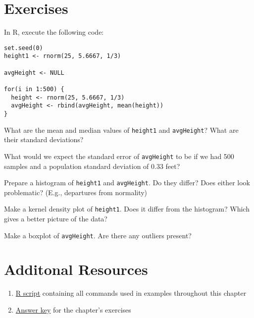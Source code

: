 \section{Exercises}

\prob In R, execute the following code:
\begin{Verbatim}[samepage=TRUE]
set.seed(0)
height1 <- rnorm(25, 5.6667, 1/3)
 
avgHeight <- NULL
 
for(i in 1:500) {
  height <- rnorm(25, 5.6667, 1/3)
  avgHeight <- rbind(avgHeight, mean(height))
}
\end{Verbatim}

\prob What are the mean and median values of \verb|height1| and \verb|avgHeight|? What are their standard deviations?

\prob What would we expect the standard error of \verb|avgHeight| to be if we had 500 samples and a population standard deviation of 0.33 feet?

\prob Prepare a histogram of \verb|height1| and \verb|avgHeight|. Do they differ? Does either look problematic? (E.g., departures from normality)

\prob Make a kernel density plot of \verb|height1|. Does it differ from the histogram? Which gives a better picture of the data?

\prob Make a boxplot of \verb|avgHeight|. Are there any outliers present?

\section{Additonal Resources}
\begin{enumerate}
	\item \href{http://book.chriswetherill.me/part1/RScripts/uncertainty.R}{R script} containing all commands used in examples throughout this chapter
	\item \href{http://book.chriswetherill.me/part1/answers/uncertainty.html}{Answer key} for the chapter's exercises
\end{enumerate}